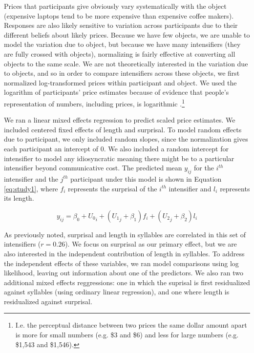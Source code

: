 \documentclass[10pt,letterpaper]{article}
\begin{document}
Prices that participants give obviously vary systematically with the object (expensive laptops tend to be more expensive than expensive coffee makers).
Responses are also likely sensitive to variation across participants due to their different beliefs about likely prices.
Because we have few objects, we are unable to model the variation due to object, but because we have many intensifiers (they are fully crossed with objects), normalizing is fairly effective at converting all objects to the same scale.
We are not theoretically interested in the variation due to objects, and so in order to compare intensifiers across these objects, we first normalized log-transformed prices within participant and object.
We used the logarithm of participants' price estimates because of evidence that people's representation of numbers, including prices, is logarithmic \cite{fechner_elements_1860}.\footnote{
  I.e. the perceptual distance between two prices the same dollar amount apart is more for small numbers (e.g. \$3 and \$6) and less for large numbers (e.g. \$1,543 and \$1,546).
}

We ran a linear mixed effects regression to predict scaled price estimates. We included centered fixed effects of length and surprisal. To model random effects due to participant, we only included random slopes, since the normalization gives each participant an intercept of 0.  We also included a random intercept for intensifier to model any idiosyncratic meaning there might be to a particular intensifier beyond communicative cost. 
The predicted mean $y_{ij}$ for the $i^{th}$ intensifier and the $j^{th}$ participant under this model is shown in Equation \ref{eq:study1}, where $f_i$ represents the surprisal of the $i^{th}$ intensifier and $l_i$ represents its length. %


\begin{equation}
\label{eq:study1}
y_{ij} = \beta_0 + {U_0}_{i} + ({U_1}_{j} + \beta_1) {f}_{i} + ({U_2}_{j} + \beta_2) {l}_{i}
\end{equation}

As previously noted, surprisal and length in syllables are correlated in this set of intensifiers ($r=0.26$).
We focus on surprisal as our primary effect, but we are also interested in the independent contribution of length in syllables.
To address the independent effects of these variables, we ran model comparisons using log likelihood, leaving out information about one of the predictors.
We also ran two additional mixed effects reggressions: one in which the suprisal is first residualized against syllables (using ordinary linear regression), and one where length is residualized against surprisal.
\end{document}
